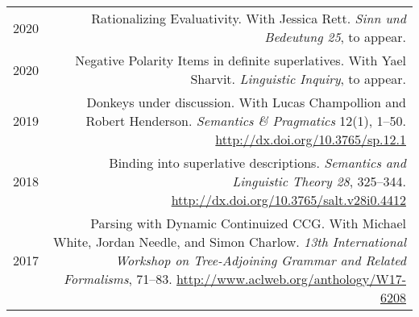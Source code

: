 \documentclass[12pt]{article}
\renewcommand{\arraystretch}{1.25} %
\newcommand{\doi}[1]{\url{http://dx.doi.org/#1}}
\newcommand{\refmark}{\textcolor{gray}{\textdagger}}
\begin{document}
\begingroup
\renewcommand{\arraystretch}{1.5} %
\begin{longtable}{LR}
  2020  & Rationalizing Evaluativity.\newline
          With Jessica Rett.\newline
          \textit{Sinn und Bedeutung 25}, to appear.\\
  2020  & Negative Polarity Items in definite superlatives.\newline
          With Yael Sharvit.\newline
          \textit{Linguistic Inquiry}, to appear.\\
  2019  & Donkeys under discussion.\newline
          With Lucas Champollion and Robert Henderson.\newline
          \textit{Semantics \& Pragmatics} 12(1), 1--50.\newline
          \doi{10.3765/sp.12.1}\\
  2018  & Binding into superlative descriptions.\newline
          \textit{Semantics and Linguistic Theory 28}, 325--344.\newline
          \doi{10.3765/salt.v28i0.4412}\\
  2017  & Parsing with Dynamic Continuized CCG.\newline
          With Michael White, Jordan Needle, and Simon Charlow.\newline
          \textit{13th International Workshop on Tree-Adjoining Grammar and
          Related Formalisms}, 71--83.\newline
          \url{http://www.aclweb.org/anthology/W17-6208}\\

\end{longtable}
\end{document}
